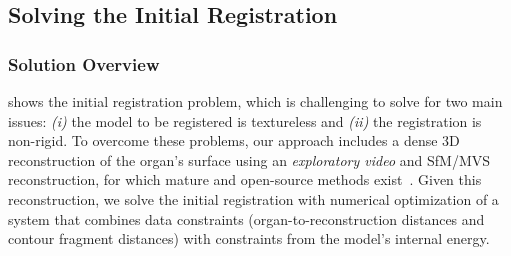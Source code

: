 
\subsection{Solving the Initial Registration}
\label{sec:registrationOverview}

\subsubsection{Solution Overview}
 shows the initial registration problem, which is challenging to solve for two main issues: \textit{(i)} the model to be registered is textureless and \textit{(ii)} the registration is non-rigid.
To overcome these problems, our approach includes a dense 3D reconstruction of the organ's surface using an \emph{exploratory video} and SfM/MVS reconstruction, for which mature and open-source methods exist~\cite{Meshroom}. Given this reconstruction, we solve the initial registration with numerical optimization of a system that combines data constraints (organ-to-reconstruction distances and contour fragment distances) with constraints from the model's internal energy.

